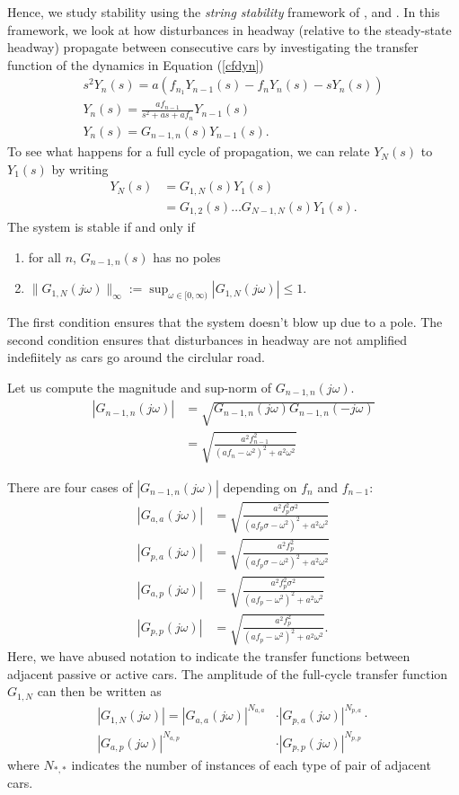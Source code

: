 \documentclass[10pt,twocolumn]{article}
\begin{document}
Hence, we study stability using the {\em string stability} framework of \cite{Liang}, \cite{Konishi} and \cite{Yanakiev}. In this framework, we look at how disturbances in headway (relative to the steady-state headway) propagate between consecutive cars by investigating the transfer function of the dynamics in Equation (\ref{cfdyn})
\begin{gather}
s^2 Y_n(s) = a(f_{n_1}Y_{n-1}(s) - f_nY_n(s) - sY_n(s))\\
Y_n(s) = \frac{af_{n-1}}{s^2 + as + af_n}Y_{n-1}(s)\\
Y_n(s) = G_{n-1,n}(s)Y_{n-1}(s).
\end{gather}
To see what happens for a full cycle of propagation, we can relate $Y_N(s)$ to $Y_1(s)$ by writing
\begin{align}
Y_N(s) &= G_{1,N}(s) Y_1(s)\\
&= G_{1,2}(s) \dots G_{N-1,N}(s) Y_1(s).
\end{align}
The system is stable if and only if
\begin{enumerate}
\item for all $n$, $G_{n-1,n}(s)$ has no poles
\item $\|G_{1,N}(j\omega)\|_{\infty} := \displaystyle \sup_{\omega \in [0,\infty)} |G_{1,N}(j\omega)| \leq 1$.
\end{enumerate}
The first condition ensures that the system doesn't blow up due to a pole. The second condition ensures that disturbances in headway are not amplified indefiitely as cars go around the circlular road.

Let us compute the magnitude and sup-norm of $G_{n-1,n}(j\omega)$.
\begin{align}
|G_{n-1,n}(j\omega)| &= \sqrt{G_{n-1,n}(j\omega)G_{n-1,n}(-j\omega)}\\
&= \sqrt{\frac{a^2f_{n-1}^2}{(af_n - \omega^2)^2 + a^2\omega^2}}
\end{align}

There are four cases of $|G_{n-1,n}(j\omega)|$ depending on $f_n$ and $f_{n-1}$:
\begin{align}
|G_{a,a}(j\omega)| &= \sqrt{\frac{a^2f_p^2\sigma^2}{(af_p\sigma - \omega^2)^2 + a^2\omega^2}}\\
|G_{p,a}(j\omega)| &= \sqrt{\frac{a^2f_p^2}{(af_p\sigma - \omega^2)^2 + a^2\omega^2}}\\
|G_{a,p}(j\omega)| &= \sqrt{\frac{a^2f_p^2\sigma^2}{(af_p - \omega^2)^2 + a^2\omega^2}}\\
|G_{p,p}(j\omega)| &= \sqrt{\frac{a^2f_p^2}{(af_p - \omega^2)^2 + a^2\omega^2}}.
\end{align}
Here, we have abused notation to indicate the transfer functions between adjacent passive or active cars.
The amplitude of the full-cycle transfer function $G_{1,N}$ can then be written as
\begin{align*}
|G_{1,N}(j\omega)| = |G_{a,a}(j\omega)|^{N_{a,a}} &\cdot |G_{p,a}(j\omega)|^{N_{p,a}} \cdot \\ |G_{a,p}(j\omega)|^{N_{a,p}} &\cdot |G_{p,p}(j\omega)|^{N_{p,p}}
\end{align*}
where $N_{*,*}$ indicates the number of instances of each type of pair of adjacent cars.
\end{document}
